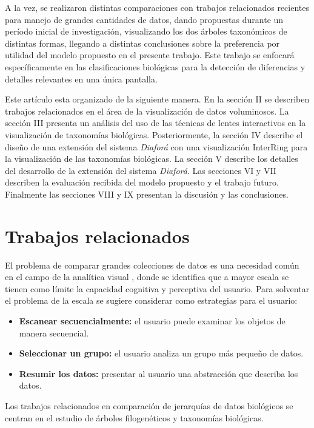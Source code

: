 \documentclass[journal]{IEEEtran}
\begin{document}
A la vez, se realizaron distintas comparaciones con trabajos relacionados recientes para manejo de grandes cantidades de datos, dando propuestas durante un período inicial de investigación, visualizando los dos árboles taxonómicos de distintas formas, llegando a distintas conclusiones sobre la preferencia por utilidad del modelo propuesto en el presente trabajo. Este trabajo se enfocará 
específicamente en las clasificaciones biológicas para la detección de diferencias y detalles relevantes 
en una única pantalla.

Este artículo esta organizado de la siguiente manera. En la sección II se describen trabajos relacionados en el área de la visualización de datos voluminosos. La sección III presenta un análisis del uso de las técnicas de lentes interactivos en la visualización de taxonomías biológicas. Posteriormente, la sección IV describe el diseño de  una extensión del sistema \emph{Diaforá} con una visualización InterRing para la visualización de las taxonomías biológicas. La sección V describe los detalles del  desarrollo de la extensión del sistema \emph{Diaforá}. Las secciones VI y VII describen la evaluación recibida del modelo propuesto y el trabajo futuro. Finalmente las secciones VIII y IX presentan la discusión y las conclusiones.


   \section{Trabajos relacionados}
El problema de comparar grandes colecciones de datos es una necesidad común en el campo de la analítica visual \cite{gleicher_2018}, donde se identifica
que a mayor escala se tienen como límite la capacidad cognitiva y perceptiva del usuario.  Para solventar el problema de la escala se sugiere considerar como estrategias para el usuario:
\begin{itemize}
  \item \textbf{Escanear secuencialmente:} el usuario puede examinar los objetos de manera secuencial.
  \item \textbf{Seleccionar un grupo:} el usuario analiza un grupo más pequeño de datos.
  \item  \textbf{Resumir los datos:} presentar al usuario una abstracción que describa los datos.
\end{itemize}
Los trabajos relacionados en comparación de jerarquías de datos biológicos se centran en el estudio de árboles filogenéticos y taxonomías
biológicas.
\end{document}
